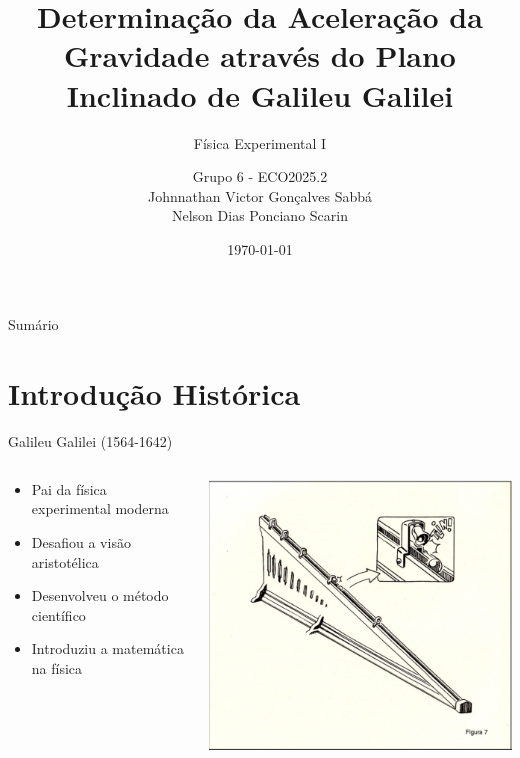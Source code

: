 \documentclass[12pt]{beamer}
\title[Plano Inclinado de Galileu]{Determinação da Aceleração da Gravidade através do Plano Inclinado de Galileu Galilei}
\subtitle{Física Experimental I}
\author{Grupo 6 - ECO2025.2 \\ Johnnathan Victor Gonçalves Sabbá \\ Nelson Dias Ponciano Scarin}
\institute{Instituto Federal Catarinense}
\date{\today}
\begin{document}
\begin{frame}
    \titlepage
\end{frame}

\begin{frame}{Sumário}
    \tableofcontents
\end{frame}

\section{Introdução Histórica}

\begin{frame}{Galileu Galilei (1564-1642)}
    \begin{columns}
        \begin{column}{0.6\textwidth}
            \begin{itemize}
                \item Pai da física experimental moderna
                \item Desafiou a visão aristotélica
                \item Desenvolveu o método científico
                \item Introduziu a matemática na física
            \end{itemize}
        \end{column}
        \begin{column}{0.4\textwidth}
            \includegraphics[width=\textwidth]{pictures/GalileuPlano.png}
        \end{column}
    \end{columns}
\end{frame}
\end{document}

